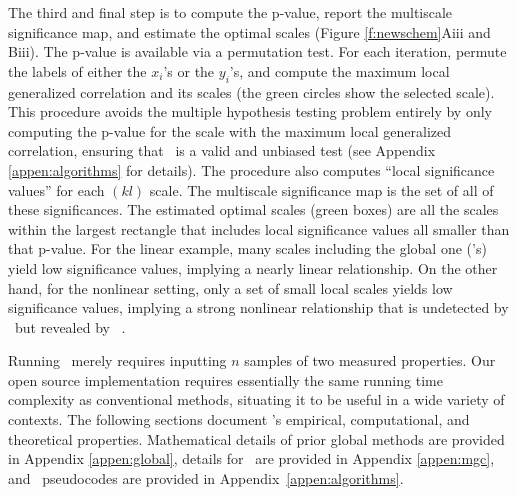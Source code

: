 \documentclass[11pt]{article}
\begin{document}
The third and final step is to compute the p-value, report the  {multiscale significance map}, and estimate the optimal scales  (Figure \ref{f:newschem}{\color{magenta}Aiii} and {\color{magenta}Biii}). 
The p-value is available via a permutation test.  For each iteration, permute the labels of either the $x_i$'s or the $y_i$'s, and compute the maximum local generalized correlation and its scales (the green circles show the selected scale).  This procedure avoids the multiple hypothesis testing problem entirely by only computing the p-value for the scale with the maximum local generalized correlation, ensuring that \Mgc~is a valid and unbiased test (see Appendix \ref{appen:algorithms} for details).  The procedure also computes ``local significance values''  for each $(kl)$ scale.  The multiscale significance map is the set of all of these significances.   
The estimated optimal scales (green boxes) are all the scales within the largest rectangle that includes local significance values all smaller than that p-value.
For the linear example, many scales including the global one (\Dcorr's) yield low significance values, implying a nearly linear relationship.
On the other hand, for the nonlinear setting, only a set of small local scales yields low significance values, implying a strong nonlinear relationship that is undetected by \Dcorr~but revealed by \Mgc~.

Running \Mgc~merely requires inputting $n$ samples of two measured properties.  
Our open source implementation\footnotemark{} requires essentially the same running  time complexity as conventional methods, situating it to be useful in a wide variety of contexts. 
The following sections document \Mgc's empirical, computational, and theoretical properties. Mathematical details of prior global methods are provided in Appendix \ref{appen:global}, details for \Mgc~are provided in Appendix \ref{appen:mgc}, and \Mgc~pseudocodes are provided in Appendix~\ref{appen:algorithms}.
\end{document}
